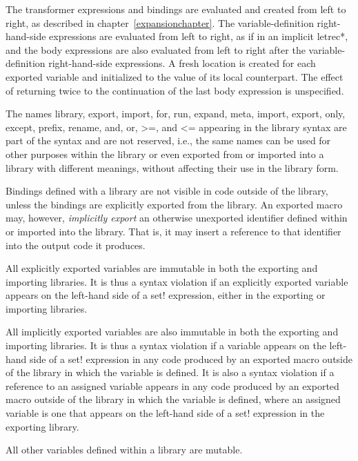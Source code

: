 The transformer expressions and bindings are evaluated and created
from left to right, as described in chapter~\ref{expansionchapter}.
The variable-definition right-hand-side expressions are evaluated
from left to right, as if in an implicit {\cf letrec*},
and the body expressions are also evaluated from left to right
after the variable-definition right-hand-side expressions.
A fresh location is created for each exported variable and initialized
to the value of its local counterpart.
The effect of returning twice to the continuation of the last body
expression is unspecified.

The names {\cf library}, {\cf export}, {\cf import},
{\cf for}, {\cf run}, {\cf expand}, {\cf meta},
{\cf import}, {\cf export}, {\cf only}, {\cf except}, {\cf
  prefix}, {\cf rename}, {\cf and}, {\cf or}, {\cf >=}, and {\cf <=}
appearing in the library syntax are part of the
syntax and are not reserved, i.e., the same names can be used for other
purposes within the library or even exported from or imported 
into a library with different meanings, without affecting their
use in the {\cf library} form.

Bindings defined with a library are not visible in code
outside of the library, unless the bindings are explicitly exported from the
library. 
An exported macro may, however, \emph{implicitly export} an otherwise
unexported identifier defined within or imported into the library.
That is, it may insert a reference to that identifier into the output code
it produces.

\label{importsareimmutablesection} 
All explicitly exported variables are immutable in both the
exporting and importing libraries. 
It is thus a syntax violation if an
explicitly exported variable appears on the left-hand side of a {\cf set!}
expression, either in the exporting or importing libraries.

All implicitly exported variables are also immutable in both the
exporting and importing libraries.
It is thus a syntax violation if a
variable appears on the left-hand side of a {\cf set!}
expression in any code produced by an exported macro outside of the
library in which the variable is defined.
It is also a syntax violation if a
reference to an assigned variable appears in any code produced by
an exported macro outside of the library in which the variable is defined,
where an assigned variable is one that appears on the left-hand
side of a {\cf set!} expression in the exporting library.

All other variables defined within a library are mutable.

